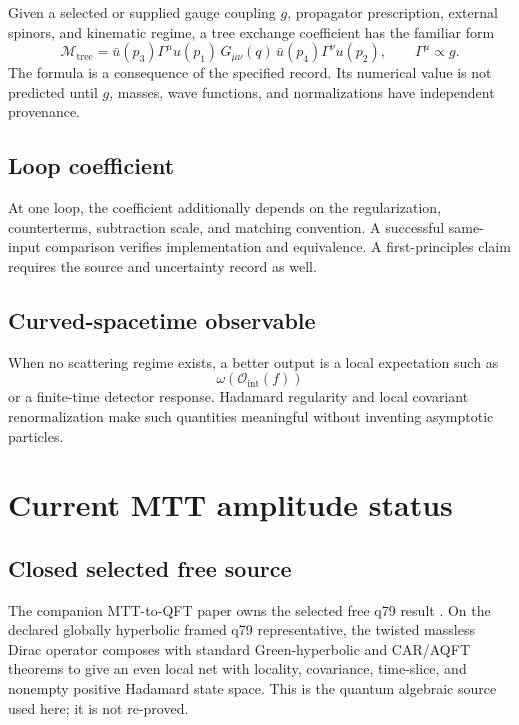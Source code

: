 \documentclass[11pt,a4paper]{article}
\numberwithin{equation}{section}
\theoremstyle{definition}
\theoremstyle{remark}
\newcommand{\cO}{\mathcal O}
\begin{document}
Given a selected or supplied gauge coupling \(g\), propagator prescription,
external spinors, and kinematic regime, a tree exchange coefficient has
the familiar form
\[
\mathcal M_{\mathrm{tree}}
=
\bar u(p_3)\Gamma^\mu u(p_1)\,
G_{\mu\nu}(q)\,
\bar u(p_4)\Gamma^\nu u(p_2),
\qquad \Gamma^\mu\propto g.
\]
The formula is a consequence of the specified record.  Its numerical
value is not predicted until \(g\), masses, wave functions, and
normalizations have independent provenance.

\subsection{Loop coefficient}

At one loop, the coefficient additionally depends on the regularization,
counterterms, subtraction scale, and matching convention.  A successful
same-input comparison verifies implementation and equivalence.  A
first-principles claim requires the source and uncertainty record as well.

\subsection{Curved-spacetime observable}

When no scattering regime exists, a better output is a local expectation
such as
\[
\omega\!\left(\cO_{\mathrm{int}}(f)\right)
\]
or a finite-time detector response.  Hadamard regularity and local
covariant renormalization make such quantities meaningful without
inventing asymptotic particles.

\section{Current MTT amplitude status}

\subsection{Closed selected free source}

The companion MTT-to-QFT paper owns the selected free q79 result
\cite{NeroQFT2026}.  On the declared globally hyperbolic framed q79
representative, the twisted massless Dirac operator composes with standard
Green-hyperbolic and CAR/AQFT theorems to give an even local net with
locality, covariance, time-slice, and nonempty positive Hadamard state
space.  This is the quantum algebraic source used here; it is not re-proved.
\end{document}
